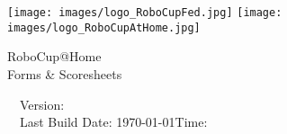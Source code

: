\documentclass[11pt, a4paper]{book}
\begin{document}
\begin{titlepage}
  \begin{center}
    {
      \texttt{[image: images/logo\_RoboCupFed.jpg]}
      \hfill
      \texttt{[image: images/logo\_RoboCupAtHome.jpg]}\\[1.23ex]
    }
    \vspace{2.7 cm}
    \hrulefill\par
    {%
      \vspace*{.27cm}
      \Huge{RoboCup@Home}\\[1.23ex]
      \ifthenelse{\equal{\league}{}}{}{\huge{\leagueFullName}\\[1.23ex]}
      \Large Forms \& Scoresheets\\[2ex]
    }
    \hrulefill\par
    \vfill
    ~~Version: \YEAR{}\quad{}\svnRevision{}~~\\
    ~~Last Build Date: \today \quad Time: \the\time{}~~\\
    ~~\svnChangeData{}~~%
  \end{center}
\end{titlepage}

\pagestyle{plain}



\renewcommand{\shortScoresheet}{false}


\renewcommand{\currentTest}{Poster Session}
\begin{scoresheet}

\end{scoresheet}



\renewcommand{\currentTest}{Carry my Luggage}
\begin{scoresheet}

\end{scoresheet}

\renewcommand{\currentTest}{Clean Up}
\begin{scoresheet}

\end{scoresheet}

\renewcommand{\currentTest}{Farewell}
\begin{scoresheet}

\end{scoresheet}
\end{document}
